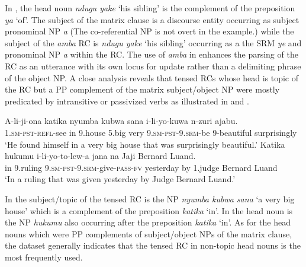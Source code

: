 \documentclass[output=paper,colorlinks,citecolor=brown]{langscibook}
\begin{document}
In , the head noun \textit{ndugu yake} ‘his sibling’ is the complement of the preposition \textit{ya} ‘of’. The subject of the matrix clause is a discourse entity occurring as subject pronominal NP \textit{a} (The co-referential NP is not overt in the example.) while the subject of the \textit{amba} RC is \textit{ndugu yake} ‘his sibling’ occurring as a the SRM \textit{ye} and pronominal NP \textit{a} within the RC. The use of \textit{amba} in  enhances the parsing of the RC as an utterance with its own locus for update rather than a delimiting phrase of the object NP. A close analysis reveals that tensed RCs whose head is topic of the RC but a PP complement of the matrix subject/object NP were mostly predicated by intransitive or passivized verbs as illustrated in  and .

\ea%
    \label{ex:mwamzandi:31}
    \gll    A-li-ji-ona katika nyumba kubwa sana i-li-yo-kuwa n-zuri ajabu.\\
            \textsc{1.sm-pst-refl-}see in 9.house 5.big very \textsc{9.sm-pst-9.srm-}be 9-beautiful surprisingly\\
    \glt    ‘He found himself in a very big house that was surprisingly beautiful.’
\ex%
    \label{ex:mwamzandi:32}
    \gll    Katika hukumu i-li-yo-to-lew-a jana na Jaji Bernard Luand.\\
            in 9.ruling \textsc{9.sm-pst-9.srm-}give\textsc{-pass-fv} yesterday by 1.judge Bernard Luand\\
    \glt    ‘In a ruling that was given yesterday by Judge Bernard Luand.’
\z

In  the subject/topic of the tensed RC is the NP \textit{nyumba kubwa sana} ‘a very big house’ which is a complement of the preposition \textit{katika} ‘in’. In  the head noun is the NP \textit{hukumu} also occurring after the preposition \textit{katika} ‘in’. As for the head nouns which were PP complements of subject/object NPs of the matrix clause, the dataset generally indicates that the tensed RC in non-topic head nouns is the most frequently used.
\end{document}

